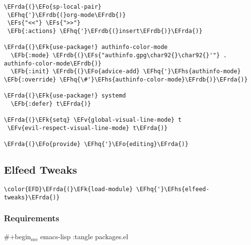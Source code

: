 \documentclass[a4wide,10pt]{article}
\newcommand{\EFs}[1]{\textcolor{EFs}{#1}} %
\newcommand{\EFk}[1]{\textcolor{EFk}{#1}} %
\newcommand{\EFb}[1]{\textcolor{EFb}{#1}} %
\newcommand{\EFv}[1]{\textcolor{EFv}{#1}} %
\newcommand{\EFo}[1]{\textcolor{EFo}{#1}} %
\newcommand{\EFhq}[1]{\textcolor{EFhq}{#1}} %
\newcommand{\EFhs}[1]{\textcolor{EFhs}{#1}} %
\newcommand{\EFrda}[1]{\textcolor{EFrda}{#1}} %
\newcommand{\EFrdb}[1]{\textcolor{EFrdb}{#1}} %
\begin{document}
\begin{Code}
\begin{Verbatim}
\EFrda{(}\EFo{sp-local-pair}
 \EFhq{'}\EFrdb{(}org-mode\EFrdb{)}
 \EFs{"<<"} \EFs{">>"}
 \EFb{:actions} \EFhq{'}\EFrdb{(}insert\EFrdb{)}\EFrda{)}

\EFrda{(}\EFk{use-package!} authinfo-color-mode
  \EFb{:mode} \EFrdb{(}\EFs{"authinfo.gpg\char92{}\char92{}'"} . authinfo-color-mode\EFrdb{)}
  \EFb{:init} \EFrdb{(}\EFo{advice-add} \EFhq{'}\EFhs{authinfo-mode} \EFb{:override} \EFhq{\#'}\EFhs{authinfo-color-mode}\EFrdb{)}\EFrda{)}

\EFrda{(}\EFk{use-package!} systemd
  \EFb{:defer} t\EFrda{)}

\EFrda{(}\EFk{setq} \EFv{global-visual-line-mode} t
 \EFv{evil-respect-visual-line-mode} t\EFrda{)}

\EFrda{(}\EFo{provide} \EFhq{'}\EFo{editing}\EFrda{)}
\end{Verbatim}
\end{Code}

\subsection{Elfeed Tweaks}
\label{sec:org301e38f}
\begin{Code}
\begin{Verbatim}
\color{EFD}\EFrda{(}\EFk{load-module} \EFhq{'}\EFhs{elfeed-tweaks}\EFrda{)}
\end{Verbatim}
\end{Code}
\subsubsection{Requirements}
\label{sec:orge463788}
\#+begin\textsubscript{src} emacs-lisp :tangle packages.el
\end{document}
